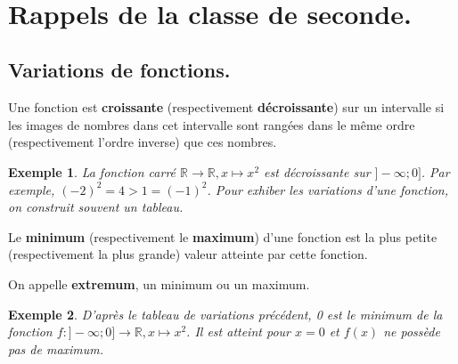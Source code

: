 \documentclass[a4paper,11pt]{article}
\title{}
\author{}
\date{}
\newcommand{\R}{\mathbb{R}}
\theoremstyle{break}
\newtheorem{exemple}{Exemple}
\newcounter{numero}
\newcommand{\exo}{
  \addtocounter{numero}{1}%
  \textbf{\underline{Exercice \arabic{numero}:}}\quad}
\begin{document}
  \setlength{\unitlength}{1mm}
  \setlength\parindent{0mm}
  
  
  ~
  \medskip
  
  \section{Rappels de la classe de seconde.}
  
  \subsection{Variations de fonctions.}
  
  \begin{Def}
    Une fonction est \textbf{croissante} (respectivement \textbf{décroissante}) sur un
    intervalle si les images de nombres dans cet intervalle sont rangées dans le même
    ordre (respectivement l'ordre inverse) que ces nombres.
  \end{Def}
  
  \begin{exemple}
    La fonction carré $\R \to \R, x \mapsto x^2$ est décroissante sur $]-\infty;0]$. 
    Par exemple, $(-2)^2=4>1=(-1)^2$. Pour exhiber les variations d'une fonction, 
    on construit souvent un tableau.
    
  \end{exemple}
  
  
  
  \begin{Def}
    Le \textbf{minimum} (respectivement le \textbf{maximum}) d’une fonction est la plus 
    petite (respectivement la plus grande) valeur atteinte par cette fonction.
    
    On appelle \textbf{extremum}, un minimum ou un maximum.
  \end{Def}
  
  \begin{exemple}
    D'après le tableau de variations précédent, 0 est le minimum de la fonction
    $f:]-\infty ; 0] \to \R, x \mapsto x^2$. Il est atteint pour $x=0$ et $f(x)$
    ne possède pas de maximum.
  \end{exemple}
  
\end{document}

